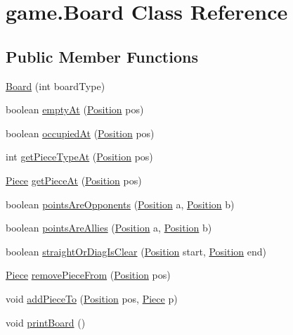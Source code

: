 \hypertarget{classgame_1_1_board}{\section{game.\-Board Class Reference}
\label{classgame_1_1_board}
}
\subsection*{Public Member Functions}
\begin{DoxyCompactItemize}
\item 
\hyperlink{classgame_1_1_board_a03ab3e485bfe19fc57cc4985b252633b}{Board} (int board\-Type)
\item 
boolean \hyperlink{classgame_1_1_board_ad42721c60eee469c46075ee976c4fe37}{empty\-At} (\hyperlink{classgame_1_1_position}{Position} pos)
\item 
boolean \hyperlink{classgame_1_1_board_a9a0acc7212f18f11d2ea71248ee0641b}{occupied\-At} (\hyperlink{classgame_1_1_position}{Position} pos)
\item 
int \hyperlink{classgame_1_1_board_ae945b5be4a7c7ded9abf70486f564389}{get\-Piece\-Type\-At} (\hyperlink{classgame_1_1_position}{Position} pos)
\item 
\hyperlink{classpieces_1_1_piece}{Piece} \hyperlink{classgame_1_1_board_ab33022a9aed668318676e718d7d67b20}{get\-Piece\-At} (\hyperlink{classgame_1_1_position}{Position} pos)
\item 
boolean \hyperlink{classgame_1_1_board_ac84d149dded8dc8b106cec222d20933c}{points\-Are\-Opponents} (\hyperlink{classgame_1_1_position}{Position} a, \hyperlink{classgame_1_1_position}{Position} b)
\item 
boolean \hyperlink{classgame_1_1_board_ae8c779458e916755cd15c672dbe7628b}{points\-Are\-Allies} (\hyperlink{classgame_1_1_position}{Position} a, \hyperlink{classgame_1_1_position}{Position} b)
\item 
boolean \hyperlink{classgame_1_1_board_a707fca7d3091d8af2ba7e66fcea90e31}{straight\-Or\-Diag\-Is\-Clear} (\hyperlink{classgame_1_1_position}{Position} start, \hyperlink{classgame_1_1_position}{Position} end)
\item 
\hyperlink{classpieces_1_1_piece}{Piece} \hyperlink{classgame_1_1_board_aeb0730b986f552300a5a68d7a68bd8d7}{remove\-Piece\-From} (\hyperlink{classgame_1_1_position}{Position} pos)
\item 
void \hyperlink{classgame_1_1_board_a88e794ba7dec65d4b8582016615dec0f}{add\-Piece\-To} (\hyperlink{classgame_1_1_position}{Position} pos, \hyperlink{classpieces_1_1_piece}{Piece} p)
\item 
void \hyperlink{classgame_1_1_board_a33d619089bcaef94b641ecd6d014cfac}{print\-Board} ()
\end{DoxyCompactItemize}
